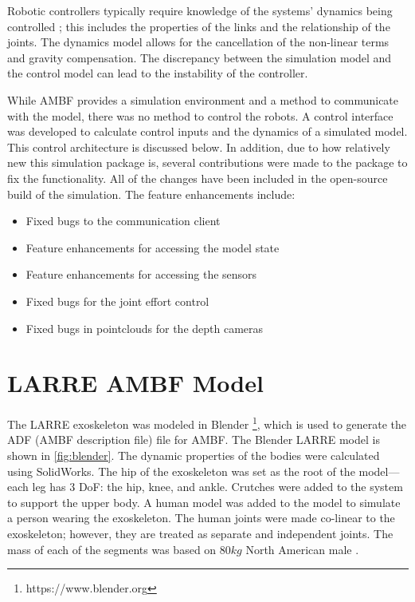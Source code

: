 Robotic controllers typically require knowledge of the systems' dynamics being controlled \cite{piltan2012design}; this includes the properties of the links and the relationship of the joints. The dynamics model allows for the cancellation of the non-linear terms and gravity compensation. The discrepancy between the simulation model and the control model can lead to the instability of the controller. 
 
 While AMBF provides a simulation environment and a method to communicate with the model, there was no method to control the robots. A control interface was developed to calculate control inputs and the dynamics of a simulated model. This control architecture is discussed below. In addition, due to how relatively new this simulation package is, several contributions were made to the package to fix the functionality. All of the changes have been included in the open-source build of the simulation. The feature enhancements include:
 \begin{itemize}
     \item Fixed bugs to the communication client
     \item Feature enhancements for accessing the model state
     \item Feature enhancements for accessing the sensors 
     \item Fixed bugs for the joint effort control
     \item Fixed bugs in pointclouds for the depth cameras
 \end{itemize}
 
 \section{LARRE AMBF Model}
 
 The LARRE exoskeleton was modeled in Blender \footnote{https://www.blender.org}, which is used to generate the ADF (AMBF description file) file for AMBF. The Blender LARRE model is shown in \autoref{fig:blender}. The dynamic properties of the bodies were calculated using SolidWorks. The hip of the exoskeleton was set as the root of the model—each leg has 3 DoF: the hip, knee, and ankle. Crutches were added to the system to support the upper body. A human model was added to the model to simulate a person wearing the exoskeleton. The human joints were made co-linear to the exoskeleton; however, they are treated as separate and independent joints. The mass of each of the segments was based on $80kg$ North American male \cite{BMI} \cite{drillis1964body}.
 

